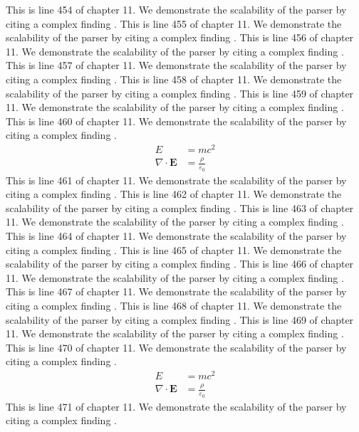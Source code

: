 This is line 454 of chapter 11. We demonstrate the scalability of the parser by citing a complex finding \cite{ref11_454}.
This is line 455 of chapter 11. We demonstrate the scalability of the parser by citing a complex finding \cite{ref11_455}.
This is line 456 of chapter 11. We demonstrate the scalability of the parser by citing a complex finding \cite{ref11_456}.
This is line 457 of chapter 11. We demonstrate the scalability of the parser by citing a complex finding \cite{ref11_457}.
This is line 458 of chapter 11. We demonstrate the scalability of the parser by citing a complex finding \cite{ref11_458}.
This is line 459 of chapter 11. We demonstrate the scalability of the parser by citing a complex finding \cite{ref11_459}.
This is line 460 of chapter 11. We demonstrate the scalability of the parser by citing a complex finding \cite{ref11_460}.
\begin{align*}
  E &= mc^2 \\
  \nabla \cdot \mathbf{E} &= \frac{\rho}{\varepsilon_0}
\end{align*}
This is line 461 of chapter 11. We demonstrate the scalability of the parser by citing a complex finding \cite{ref11_461}.
This is line 462 of chapter 11. We demonstrate the scalability of the parser by citing a complex finding \cite{ref11_462}.
This is line 463 of chapter 11. We demonstrate the scalability of the parser by citing a complex finding \cite{ref11_463}.
This is line 464 of chapter 11. We demonstrate the scalability of the parser by citing a complex finding \cite{ref11_464}.
This is line 465 of chapter 11. We demonstrate the scalability of the parser by citing a complex finding \cite{ref11_465}.
This is line 466 of chapter 11. We demonstrate the scalability of the parser by citing a complex finding \cite{ref11_466}.
This is line 467 of chapter 11. We demonstrate the scalability of the parser by citing a complex finding \cite{ref11_467}.
This is line 468 of chapter 11. We demonstrate the scalability of the parser by citing a complex finding \cite{ref11_468}.
This is line 469 of chapter 11. We demonstrate the scalability of the parser by citing a complex finding \cite{ref11_469}.
This is line 470 of chapter 11. We demonstrate the scalability of the parser by citing a complex finding \cite{ref11_470}.
\begin{align*}
  E &= mc^2 \\
  \nabla \cdot \mathbf{E} &= \frac{\rho}{\varepsilon_0}
\end{align*}
This is line 471 of chapter 11. We demonstrate the scalability of the parser by citing a complex finding \cite{ref11_471}.
